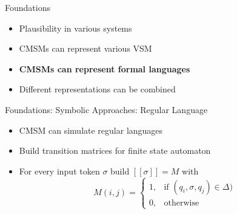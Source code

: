 \documentclass[12pt,a4paper]{beamer}
\begin{document}



\begin{frame}{Foundations}
\begin{itemize}
\item Plausibility in various systems
\item CMSMs can represent various VSM
\item \textbf{CMSMs can represent formal languages}
\item Different representations can be combined
\end{itemize}
\end{frame}


\begin{frame}{Foundations: Symbolic Approaches: Regular Language}
\begin{itemize}
\item CMSM can simulate regular languages
\item Build transition matrices for finite state automaton
\item For every input token $\sigma$ build $[[\sigma]] = M$ with
$$ M(i,j) = \left\{\begin{array}{cl} 1, & \mbox{if } (q_{i},\sigma,q_{j}) \in \Delta) \\ 0, & \mbox{otherwise} \end{array}\right.  $$
\end{itemize}
\end{frame}
\end{document}

